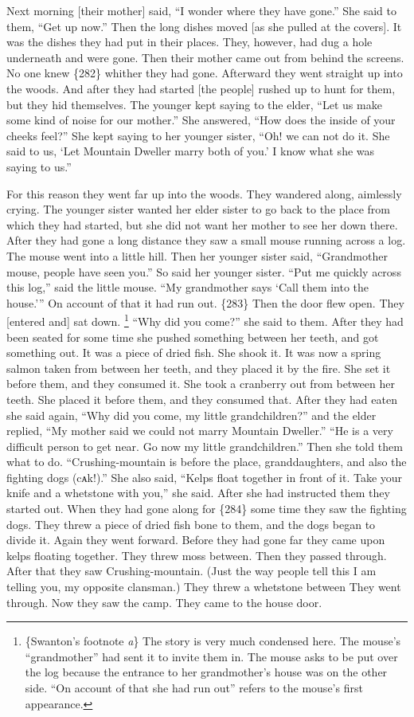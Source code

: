 Next morning [their mother] said,
“I wonder where they have gone.”
She said to them,
“Get up now.”
Then the long dishes moved [as she pulled at the covers].
It was the dishes they had put in their places.
They, however, had dug a hole underneath and were gone.
Then their mother came out from behind the screens.
No one knew \{282\} whither they had gone.
Afterward they went straight up into the woods.
And after they had started [the people] rushed up to hunt for them, but they hid themselves.
The younger kept saying to the elder,
“Let us make some kind of noise for our mother.”
She answered,
“How does the inside of your cheeks feel?”
She kept saying to her younger sister,
“Oh! we can not do it.
She said to us,
‘Let Mountain Dweller marry both of you.’
I know what she was saying to us.”

For this reason they went far up into the woods.
They wandered along, aimlessly crying.
The younger sister wanted her elder sister to go back to the place from which they had started, but she did not want her mother to see her down there.
After they had gone a long distance they saw a small mouse running across a log.
The mouse went into a little hill.
Then her younger sister said,
“Grandmother mouse, people have seen you.”
So said her younger sister.
“Put me quickly across this log,”
said the little mouse.
“My grandmother says
‘Call them into the house.’”
On account of that it had run out.
\{283\}
Then the door flew open.
They [entered and] sat down.%
\footnote{\{Swanton’s footnote \textit{a}\}
The story is very much condensed here.
The mouse’s “grandmother” had sent it to invite them in.
The mouse asks to be put over the log because the entrance to her grandmother’s house was on the other side.
“On account of that she had run out” refers to the mouse’s first appearance.}
“Why did you come?”
she said to them.
After they had been seated for some time she pushed something between her teeth, and got something out.
It was a piece of dried fish.
She shook it.
It was now a spring salmon taken from between her teeth, and they placed it by the fire.
She set it before them, and they consumed it.
She took a cranberry out from between her teeth.
She placed it before them, and they consumed that.
After they had eaten she said again,
“Why did you come, my little grandchildren?”
and the elder replied,
“My mother said we could not marry Mountain Dweller.”
“He is a very difficult person to get near.
Go now my little grandchildren.”
Then she told them what to do.
“Crushing-mountain is before the place, granddaughters, and also the fighting dogs (cᴀk!).”
She also said,
“Kelps float together in front of it.
Take your knife and a whetstone with you,”
she said.
After she had instructed them they started out.
When they had gone along for
\{284\}
some time they saw the fighting dogs.
They threw a piece of dried fish bone to them, and the dogs began to divide it.
Again they went forward.
Before they had gone far they came upon kelps floating together.
They threw moss between.
Then they passed through.
After that they saw Crushing-mountain.
(Just the way people tell this I am telling you, my opposite clansman.)
They threw a whetstone between 
They went through.
Now they saw the camp.
They came to the house door.

